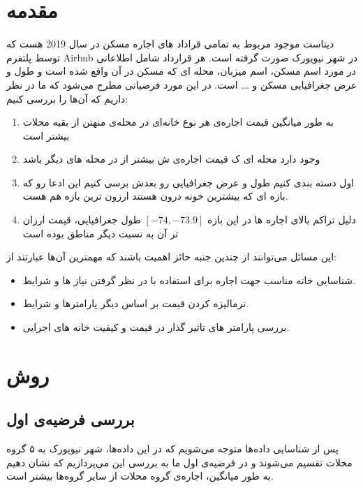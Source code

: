 \documentclass[table]{article}
\begin{document}
	\section{مقدمه}
	دیتاست موجود مربوط به تمامی قراداد های اجاره مسکن در سال 2019 هست که توسط پلتفرم Airbnb در شهر نیویورک صورت گرفته است. هر قرارداد شامل اطلاعاتی در مورد اسم مسکن، اسم میزبان، محله ای که مسکن در آن واقع شده است و طول و عرض جغرافیایی مسکن و ... است. در این مورد فرضیاتی مطرح می‌شود که ما در نظر داریم که آن‌ها را بررسی کنیم:
	
	\begin{enumerate}
		\item به طور میانگین قیمت اجاره‌ی هر نوع خانه‌ای در محله‌ی منهتن از بقیه محلات بیشتر است
		
		\item وجود دارد محله ای ک قیمت اجاره‌ی  ش بیشتر از  در محله های دیگر باشد
		
		\item اول دسته بندی کنیم طول و عرض جغرافیایی رو بعدش برسی کنیم این ادعا رو که بازه ای که بیشترین خونه درون هستند ارزون ترین بازه هم هست.
		
		\item دلیل تراکم بالای اجاره ها در این بازه 
		$[-74, -73.9]$ 
		طول جغرافیایی، قیمت ارزان تر آن به نسبت دیگر مناطق بوده است
	\end{enumerate}
	
	\noindent  این مسائل می‌توانند از چندین جنبه حائز اهمیت باشند که مهمترین آن‌ها عبارتند از:
	\begin{itemize}
		\item شناسایی خانه مناسب جهت اجاره برای استفاده با در نظر گرفتن نیاز ها و شرایط.
		
		\item نرمالیزه کردن قیمت بر اساس دیگر پارامتر‌ها و شرایط.
		
		\item بررسی پارامتر های تاثیر گذار در قیمت و کیفیت خانه های اجرایی.
		
	\end{itemize}

	\section{روش}
	\subsection{بررسی فرضیه‌ی اول}
	پس از شناسایی داده‌ها متوجه می‌شویم که در این داده‌ها، شهر نیویورک به ۵ گروه محلات تقسیم می‌شوند و در فرضیه‌ی اول ما به بررسی این می‌پردازیم که نشان دهیم به طور میانگین، اجاره‌ی گروه محلات  از سایر گروه‌ها بیشتر است. 
	
\end{document}
